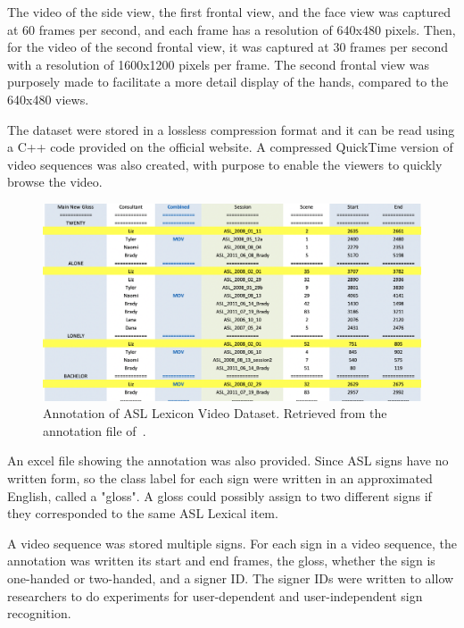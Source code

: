 The video of the side view, the first frontal view, and the face view was captured at 60 frames per second, and each frame has a resolution of 640x480 pixels. Then, for the video of the second frontal view, it was captured at 30 frames per second with a resolution of 1600x1200 pixels per frame. The second frontal view was purposely made to facilitate a more detail display of the hands, compared to the 640x480 views.

The dataset were stored in a lossless compression format and it can be read using a C++ code provided on the official website. A compressed QuickTime version of video sequences was also created, with purpose to enable the viewers to quickly browse the video.

\begin{figure}[H]
	\begin{center}
		\includegraphics[width=1.0\textwidth]{figures/excelASLDataset.png}
		\caption{Annotation of ASL Lexicon Video Dataset. Retrieved from the annotation file of~\cite{ASLLexiconVideoDataset}.} 
		\label{fig:2_ASLAnnotation}
	\end{center}
\end{figure}

An excel file showing the annotation was also provided. Since ASL signs have no written form, so the class label for each sign were written in an approximated English, called a "gloss". A gloss could possibly assign to two different signs if they corresponded to the same ASL Lexical item.

A video sequence was stored multiple signs. For each sign in a video sequence, the annotation was written its start and end frames, the gloss, whether the sign is one-handed or two-handed, and a signer ID. The signer IDs were written to allow researchers to do experiments for user-dependent and user-independent sign recognition.

